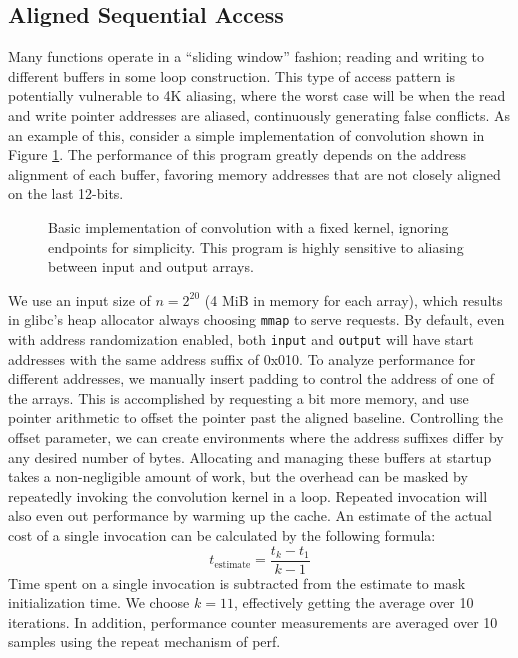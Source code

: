 \documentclass[10pt, conference, compsocconf]{IEEEtran}
\begin{document}
\subsection{Aligned Sequential Access}
Many functions operate in a ``sliding window'' fashion; reading and writing to different buffers in some loop construction.
This type of access pattern is potentially vulnerable to 4K aliasing, where the worst case will be when the read and write pointer addresses are aliased, continuously generating false conflicts.
As an example of this, consider a simple implementation of convolution shown in Figure \ref{lst:conv}.
The performance of this program greatly depends on the address alignment of each buffer, favoring memory addresses that are not closely aligned on the last 12-bits.

\begin{figure}[t]
  \centering
  
  \caption{Basic implementation of convolution with a fixed kernel, ignoring endpoints for simplicity. This program is highly sensitive to aliasing between input and output arrays.}
  \label{lst:conv}
\end{figure}

We use an input size of $n=2^{20}$ (4 MiB in memory for each array), which results in glibc's heap allocator always choosing \texttt{mmap} to serve requests.
By default, even with address randomization enabled, both \texttt{input} and \texttt{output} will have start addresses with the same address suffix of 0x010.
To analyze performance for different addresses, we manually insert padding to control the address of one of the arrays.
This is accomplished by requesting a bit more memory, and use pointer arithmetic to offset the pointer past the aligned baseline.
Controlling the offset parameter, we can create environments where the address suffixes differ by any desired number of bytes.
Allocating and managing these buffers at startup takes a non-negligible amount of work, but the overhead can be masked by repeatedly invoking the convolution kernel in a loop.
Repeated invocation will also even out performance by warming up the cache.
An estimate of the actual cost of a single invocation can be calculated by the following formula:
\[
t_{\text{estimate}} = \frac{t_{k} - t_{1}}{k - 1}
\]
Time spent on a single invocation is subtracted from the estimate to mask initialization time.
We choose $k=11$, effectively getting the average over 10 iterations.
In addition, performance counter measurements are averaged over 10 samples using the repeat mechanism of perf.
\end{document}
